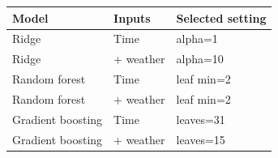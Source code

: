\begin{tabular}{lll}
\toprule
Model & Inputs & Selected setting \\
\midrule
Ridge & Time & alpha=1 \\
Ridge & + weather & alpha=10 \\
Random forest & Time & leaf min=2 \\
Random forest & + weather & leaf min=2 \\
Gradient boosting & Time & leaves=31 \\
Gradient boosting & + weather & leaves=15 \\
\bottomrule
\end{tabular}
